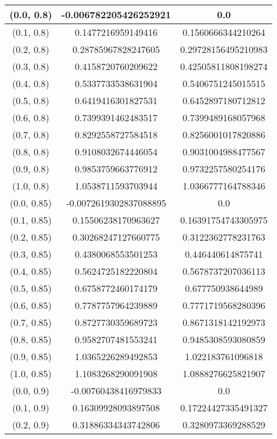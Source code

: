 \begin{table}[H]
\begin{tabular}{|c|c|c|}
\hline
(0.0, 0.8) & -0.006782205426252921 & 0.0 \\
\hline
(0.1, 0.8) & 0.1477216959149416 & 0.1560666344210264 \\
\hline
(0.2, 0.8) & 0.28785967828247605 & 0.29728156495210983 \\
\hline
(0.3, 0.8) & 0.4158720760209622 & 0.42505811808198274 \\
\hline
(0.4, 0.8) & 0.5337733538631904 & 0.5406751245015515 \\
\hline
(0.5, 0.8) & 0.6419416301827531 & 0.6452897180712812 \\
\hline
(0.6, 0.8) & 0.7399391462483517 & 0.7399489168057968 \\
\hline
(0.7, 0.8) & 0.8292558727584518 & 0.8256001017820886 \\
\hline
(0.8, 0.8) & 0.9108032674446054 & 0.9031004988477567 \\
\hline
(0.9, 0.8) & 0.9853759663776912 & 0.9732257580254176 \\
\hline
(1.0, 0.8) & 1.0538711593703944 & 1.0366777164788346 \\
\hline
\hline
(0.0, 0.85) & -0.0072619302837088895 & 0.0 \\
\hline
(0.1, 0.85) & 0.15506238170963627 & 0.16391754743305975 \\
\hline
(0.2, 0.85) & 0.30268247127660775 & 0.3122362778231763 \\
\hline
(0.3, 0.85) & 0.4380068553501253 & 0.446440614875741 \\
\hline
(0.4, 0.85) & 0.5624725182220804 & 0.5678737207036113 \\
\hline
(0.5, 0.85) & 0.6758772460174179 & 0.677750938644989 \\
\hline
(0.6, 0.85) & 0.7787757964239889 & 0.7771719568280396 \\
\hline
(0.7, 0.85) & 0.8727730359689723 & 0.8671318142192973 \\
\hline
(0.8, 0.85) & 0.9582707481553241 & 0.9485308593080859 \\
\hline
(0.9, 0.85) & 1.0365226289492853 & 1.022183761096818 \\
\hline
(1.0, 0.85) & 1.1083268290091908 & 1.0888276625821907 \\
\hline
\hline
(0.0, 0.9) & -0.00760438416979833 & 0.0 \\
\hline
(0.1, 0.9) & 0.16309928093897508 & 0.17224427335491327 \\
\hline
(0.2, 0.9) & 0.31886334343742806 & 0.3280973369288529 \\

\end{tabular}
\end{table}
